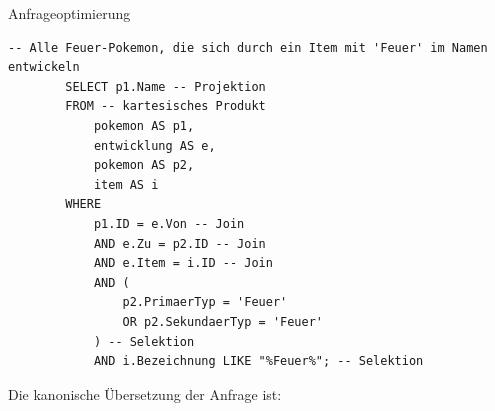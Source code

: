 \begin{example}{Anfrageoptimierung}

    \begin{lstlisting}[language=mysql]
        -- Alle Feuer-Pokemon, die sich durch ein Item mit 'Feuer' im Namen entwickeln
        SELECT p1.Name -- Projektion
        FROM -- kartesisches Produkt
            pokemon AS p1,                                
            entwicklung AS e,                 
            pokemon AS p2,                    
            item AS i                         
        WHERE
            p1.ID = e.Von -- Join
            AND e.Zu = p2.ID -- Join
            AND e.Item = i.ID -- Join            
            AND ( 
                p2.PrimaerTyp = 'Feuer'
                OR p2.SekundaerTyp = 'Feuer'
            ) -- Selektion
            AND i.Bezeichnung LIKE "%Feuer%"; -- Selektion
    \end{lstlisting}

    Die kanonische Übersetzung der Anfrage ist:


\end{example}
